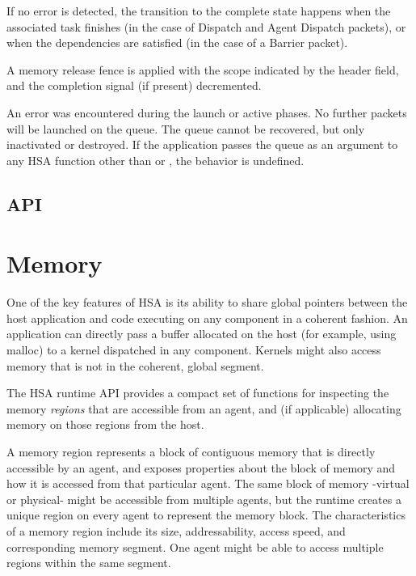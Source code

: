 \documentclass[final]{book}
\begin{document}
\begin{description}[itemsep=2pt,leftmargin=0cm, labelindent=0cm]
  If no error is detected, the transition to the complete state happens when the
  associated task finishes (in the case of Dispatch and Agent Dispatch packets),
  or when the dependencies are satisfied (in the case of a Barrier packet).

\item[Complete] A memory release fence is applied with the scope indicated by
  the  header field, and the
  completion signal (if present) decremented.

\item[Error] An error was encountered during the launch or active phases. No
  further packets will be launched on the queue. The queue cannot be recovered,
  but only inactivated or destroyed. If the application passes the queue as an
  argument to any HSA function other than  or
  , the behavior is undefined.

\end{description}

\subsection{API}


\section{Memory}\label{sec:memory}

One of the key features of HSA is its ability to share global pointers between
the host application and code executing on any component in a coherent
fashion. An application can directly pass a buffer allocated on the host (for
example, using malloc) to a kernel dispatched in any component. Kernels might
also access memory that is not in the coherent, global segment.

The HSA runtime API provides a compact set of functions for inspecting
the memory \emph{regions} that are accessible from  an agent, and (if applicable)
allocating memory on those regions from the host.

A memory region represents a block of contiguous memory that is directly
accessible by an agent, and exposes properties about the block of memory and how
it is accessed from that particular agent. The same block of memory -virtual or
physical- might be accessible from multiple agents, but the runtime creates a
unique region on every agent to represent the memory block. The characteristics
of a memory region include its size, addressability, access speed, and
corresponding memory segment. One agent might be able to access multiple regions
within the same segment.
\end{document}
